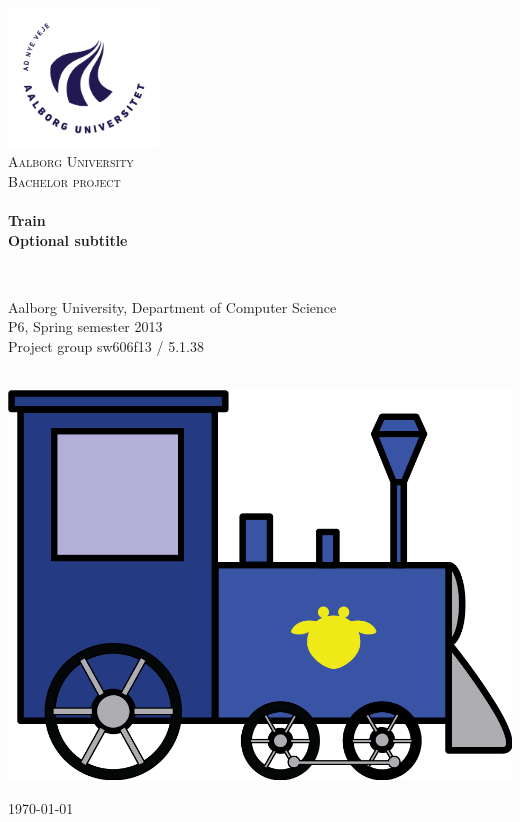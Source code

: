 \begin{titlingpage}
\begin{center}
\includegraphics[width=0.30\textwidth]{img/titelblad/AAU_logo_2012}~\\[0.5cm]

\textsc{\LARGE Aalborg University}\\[0.3cm]

\textsc{\Large Bachelor project}\\[0.5cm]

\HRule \\[0.4cm]
{ \huge \bfseries Train}\\[0.3cm]
{ \bfseries Optional subtitle}

\HRule \\[0.4cm]

\begin{minipage}{\textwidth}
\begin{center}
	Aalborg University, Department of Computer Science\\
	P6, Spring semester 2013\\
	Project group sw606f13 / 5.1.38\\
\end{center}
\end{minipage}\\[1cm]

\includegraphics[width=\textwidth]{img/train}

\vfill



{\large \today}

\end{center}
\end{titlingpage}
